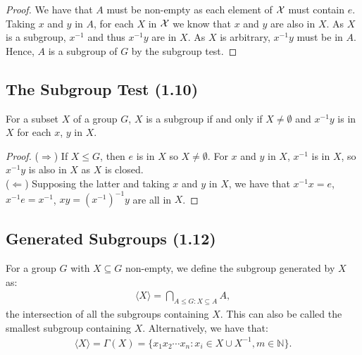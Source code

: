 \begin{proof} We have that $A$ must be non-empty as each element of $\mathcal{X}$
    must contain $e$. Taking $x$ and $y$ in $A$, for each $X$ in $\mathcal{X}$
    we know that $x$ and $y$ are also in $X$. As $X$ is a subgroup, $x^{-1}$ and
    thus $x^{-1}y$ are in $X$. As $X$ is arbitrary, $x^{-1}y$ must be in $A$.
    Hence, $A$ is a subgroup of $G$ by the subgroup test.
\end{proof}

\subsection{The Subgroup Test (1.10)} \label{1.10}

For a subset $X$ of a group $G$, $X$ is a subgroup if and only if 
$X \neq \emptyset$ and $x^{-1}y$ is in $X$ for each $x$, $y$ in $X$.

\begin{proof}
    ($\Longrightarrow$) If $X \leq G$, then $e$ is in $X$ so 
    $X \neq \emptyset$. For $x$ and $y$ in $X$, $x^{-1}$ is 
    in $X$, so $x^{-1}y$ is also in $X$ as $X$ is closed.
    \\[\baselineskip]
    ($\Longleftarrow$) Supposing the latter and taking $x$ and $y$ 
    in $X$, we have that $x^{-1}x = e$, \linebreak
    $x^{-1}e = x^{-1}$,
    $xy = (x^{-1})^{-1}y$ are all in $X$.
\end{proof}

\newpage

\subsection{Generated Subgroups (1.12)} \label{1.12}

For a group $G$ with $X \subseteq G$ non-empty, we define the subgroup generated by $X$ as:
\begin{align*}
    \langle X \rangle = \bigcap_{A \leq G : X \subseteq A} A,
\end{align*} the intersection of all the subgroups containing $X$.
This can also be called the smallest subgroup containing $X$.
Alternatively, we have that: \begin{align*}
    \langle X \rangle = \Gamma(X) = \{x_1 x_2 \cdots x_n : x_i \in X \cup X^{-1}, m \in \mathbb{N} \}.
\end{align*}


